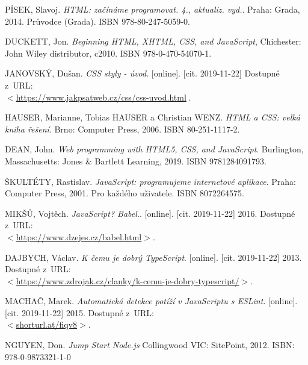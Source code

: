 

\begin{literatura}{99}

	PÍSEK, Slavoj. 
	\emph{HTML: začínáme programovat. 4., aktualiz. vyd.}. 
	Praha: Grada, 2014. Průvodce (Grada). ISBN 978-80-247-5059-0.

	DUCKETT, Jon. 
	\emph{Beginning HTML, XHTML, CSS, and JavaScript}, 
	Chichester: John Wiley distributor, c2010. ISBN 978-0-470-54070-1.

	JANOVSKÝ, Dušan.
	\emph{CSS styly - úvod}. [online]. [cit. 2019-11-22]
	Dostupné z~URL:\\ \(<\)\url{https://www.jakpsatweb.cz/css/css-uvod.html}\(\>\).

	HAUSER, Marianne, Tobias HAUSER a Christian WENZ. 
	\emph{HTML a CSS: velká kniha řešení}. 
	Brno: Computer Press, 2006. ISBN 80-251-1117-2.

	DEAN, John. 
	\emph{Web programming with HTML5, CSS, and JavaScript}. 
	Burlington, Massachusetts: Jones \& Bartlett Learning, 2019. ISBN 9781284091793.

	ŠKULTÉTY, Rastislav. 
	\emph{JavaScript: programujeme internetové aplikace}. 
	Praha: Computer Press, 2001. Pro každého uživatele. ISBN 8072264575.

	MIKŠŮ, Vojtěch.
	\emph{JavaScript? Babel.}. [online]. [cit. 2019-11-22]
	2016. Dostupné z~URL:\\ 
	\(<\)\url{https://www.dzejes.cz/babel.html}\(>\).

	DAJBYCH, Václav.
	\emph{K čemu je dobrý TypeScript}. [online]. [cit. 2019-11-22]
	2013. Dostupné z~URL:\\  \(<\)\url{https://www.zdrojak.cz/clanky/k-cemu-je-dobry-typescript/}\(>\).

	MACHAČ, Marek.
	\emph{Automatická detekce potíží v JavaScriptu s ESLint}. [online]. [cit. 2019-11-22]
	2015.  Dostupné z~URL:\\ \(<\)\url{shorturl.at/fiqv8}\(>\).

	NGUYEN, Don.
	\emph{Jump Start Node.js}
	Collingwood VIC: SitePoint, 2012. ISBN: 978-0-9873321-1-0


\end{literatura}
